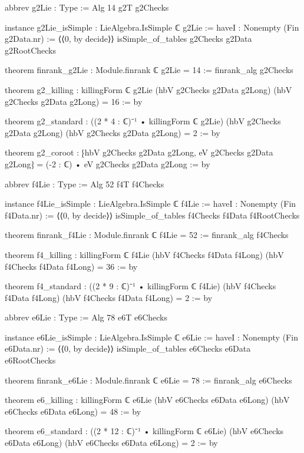 \begin{leancode}
abbrev g2Lie : Type := Alg 14 g2T g2Checks

instance g2Lie_isSimple : LieAlgebra.IsSimple ℂ g2Lie :=
  haveI : Nonempty (Fin g2Data.nr) := ⟨⟨0, by decide⟩⟩
  isSimple_of_tables g2Checks g2Data g2RootChecks

theorem finrank_g2Lie : Module.finrank ℂ g2Lie = 14 := finrank_alg g2Checks

theorem g2_killing : killingForm ℂ g2Lie (hbV g2Checks g2Data g2Long)
    (hbV g2Checks g2Data g2Long) = 16 := by

theorem g2_standard : ((2 * 4 : ℂ)⁻¹ • killingForm ℂ g2Lie) (hbV g2Checks g2Data g2Long)
    (hbV g2Checks g2Data g2Long) = 2 := by

theorem g2_coroot : ⁅hbV g2Checks g2Data g2Long, eV g2Checks g2Data g2Long⁆
    = (-2 : ℂ) • eV g2Checks g2Data g2Long := by

abbrev f4Lie : Type := Alg 52 f4T f4Checks

instance f4Lie_isSimple : LieAlgebra.IsSimple ℂ f4Lie :=
  haveI : Nonempty (Fin f4Data.nr) := ⟨⟨0, by decide⟩⟩
  isSimple_of_tables f4Checks f4Data f4RootChecks

theorem finrank_f4Lie : Module.finrank ℂ f4Lie = 52 := finrank_alg f4Checks

theorem f4_killing : killingForm ℂ f4Lie (hbV f4Checks f4Data f4Long)
    (hbV f4Checks f4Data f4Long) = 36 := by

theorem f4_standard : ((2 * 9 : ℂ)⁻¹ • killingForm ℂ f4Lie) (hbV f4Checks f4Data f4Long)
    (hbV f4Checks f4Data f4Long) = 2 := by

abbrev e6Lie : Type := Alg 78 e6T e6Checks

instance e6Lie_isSimple : LieAlgebra.IsSimple ℂ e6Lie :=
  haveI : Nonempty (Fin e6Data.nr) := ⟨⟨0, by decide⟩⟩
  isSimple_of_tables e6Checks e6Data e6RootChecks

theorem finrank_e6Lie : Module.finrank ℂ e6Lie = 78 := finrank_alg e6Checks

theorem e6_killing : killingForm ℂ e6Lie (hbV e6Checks e6Data e6Long)
    (hbV e6Checks e6Data e6Long) = 48 := by

theorem e6_standard : ((2 * 12 : ℂ)⁻¹ • killingForm ℂ e6Lie) (hbV e6Checks e6Data e6Long)
    (hbV e6Checks e6Data e6Long) = 2 := by
\end{leancode}

